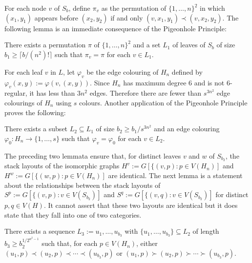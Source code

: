 \documentclass[kpfonts]{patmorin}
\renewcommand{\ge}{\geqslant}
\begin{document}
For each node $v$ of $S_b$, define $\pi_v$ as the permutation of $\{1,\ldots,n\}^2$ in which $(x_1,y_1)$ appears before $(x_2,y_2)$ if and only $(v,x_1,y_1)\prec (v,x_2,y_2)$.  The following lemma is an immediate consequence of the Pigeonhole Principle:

\begin{lem}
    There exists a permutation $\pi$ of $\{1,\ldots,n\}^2$ and a set $L_1$ of leaves of $S_b$ of size $b_1\ge \lceil b/(n^2)!\rceil$ such that $\pi_{v}=\pi$ for each $v\in L_1$.
\end{lem}


For each leaf $v$ in $L$, let $\varphi_v$ be the edge colouring of $H_n$ defined by $\varphi_v(x,y):=\varphi(v,(x,y))$. Since $H_n$ has maximum degree $6$ and is not 6-regular, it has less than $3n^2$ edges.  Therefore there are fewer than $s^{3n^2}$ edge colourings of $H_n$ using $s$ colours.  Another application of the Pigeonhole Principle proves the following:

\begin{lem}
    There exists a subset $L_2\subseteq L_1$ of size $b_2\ge b_1/s^{3n^2}$
    and an edge colouring $\varphi_0:H_n\to\{1,\ldots,s\}$ such that $\varphi_v=\varphi_0$ for each $v\in L_2$.
\end{lem}

The preceding two lemmata ensure that, for distinct leaves $v$ and $w$ of $S_{b_2}$, the stack layouts of the isomorphic graphs $H^v:=G[\{(v,p):p\in V(H_n)]$ and $H^w:=G[\{(w,p):p\in V(H_n)]$ are identical.  The next lemma is a statement about the relationships between the stack layouts of $S^p:=G[\{(v,p):v\in V(S_{b_2})]$ and $S^q:=G[\{(v,q):v\in V(S_{b_2})]$ for  distinct $p,q\in V(H)$.  It cannot assert that these two layouts are identical but it does state that they fall into one of two categories.


\begin{lem}
    There exists a sequence $L_3:=u_1,\ldots,u_{b_3}$ with $\{u_1,\ldots,u_{b_3}\}\subseteq L_2$ of length $b_3\ge b_2^{1/2^{n^2-1}}$ such that, for each $p\in V(H_n)$, either  $(u_1,p)\prec (u_2,p)\prec\cdots\prec (u_{b_3},p)$ or $(u_1,p)\succ (u_2,p)\succ\cdots\succ (u_{b_3},p)$.
\end{lem}
\end{document}
